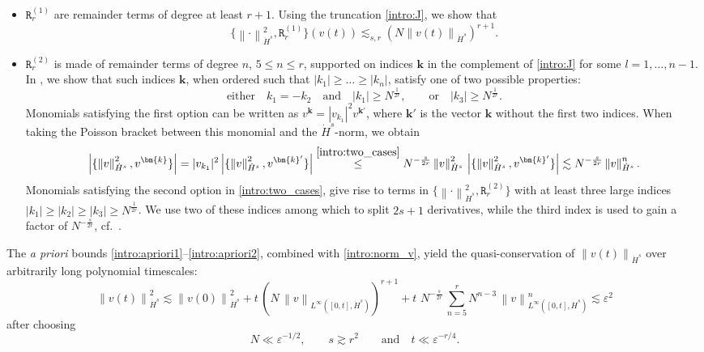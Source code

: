 \documentclass[a4paper,10pt,reqno]{article}
\theoremstyle{definition}
\theoremstyle{plain}
\theoremstyle{plain}
\theoremstyle{definition}
\theoremstyle{plain}
\theoremstyle{plain}
\theoremstyle{plain}
\theoremstyle{definition}
\theoremstyle{definition}
\newcommand{\norm}[1]{\left\lVert #1 \right\rVert}
\def \k{\bm{k}}
\begin{document}
\begin{itemize}
    \item $\mathtt{R}_r^{(1)}$ are remainder terms of degree at least $r+1$. Using the truncation \eqref{intro:J}, we show that 
    \begin{equation}\label{intro:apriori1}
         \{ \norm{\cdot}_{\dot{H}^s}^2, \mathtt{R}_r^{(1)} \} (v(t)) \lesssim_{s,r} ( N \norm{v(t)}_{\dot{H}^s})^{r+1}.
    \end{equation}
    \item $\mathtt{R}_r^{(2)}$ is made of remainder terms of degree $n$, $5\leq n\leq r$, supported on indices $\k$ in the complement of \eqref{intro:J} for some $l=1,\ldots,n-1$. In , we show that such indices $\k$, when ordered such that $|k_1|\geq \ldots \geq |k_n|$, satisfy one of two possible properties: 
    \begin{equation}\label{intro:two_cases}
    \mbox{either} \quad k_1=-k_2 \quad \mbox{and} \quad |k_1|\geq N^{\frac{1}{2r}},\qquad \mbox{or}\quad |k_3|\geq N^{\frac{1}{2r}}. 
    \end{equation}
    Monomials satisfying the first option can be written as $v^{\k} = |v_{k_1}|^2 v^{\k'}$, where $\k'$ is the vector $\k$ without the first two indices. When taking the Poisson bracket between this monomial and the $\dot{H}^s$-norm, we obtain 
    \begin{equation}\label{intro:apriori2}
        \left \lvert \{\norm{v}_{\dot{H}^s}^2, v^{\k}\} \right \rvert =
        |v_{k_1}|^2 \left \lvert \{ \norm{v}_{\dot{H}^s}^2 , v^{\k'} \} \right \rvert \stackrel{\eqref{intro:two_cases}}{\le} N^{-\frac{s}{2r}} \norm{v}_{\dot{H}^s}^2\, \left \lvert \{ \norm{v}_{\dot{H}^s}^2 , v^{\k'} \} \right \rvert  \lesssim N^{-\frac{s}{2r}} \norm{v}_{\dot{H}^s}^{n}.
    \end{equation}
Monomials satisfying the second option in \eqref{intro:two_cases}, give rise to terms in  $ \{ \norm{\cdot}_{\dot{H}^s}^2, \mathtt{R}_r^{(2)} \}$ with at least three large indices $|k_1|\geq |k_2|\geq |k_3|\geq N^{\frac{1}{2r}}$. We use two of these indices among which to split $2s+1$ derivatives, while the third index is used to gain a factor of $N^{-\frac{s}{2r}}$, cf.~.
\end{itemize}


The \emph{a priori} bounds \eqref{intro:apriori1}--\eqref{intro:apriori2}, combined with \eqref{intro:norm_v}, yield the quasi-conservation of $\norm{v(t)}_{\dot{H}^s}$ over arbitrarily long polynomial timescales: 
\begin{equation} \label{intro:bound1}
   \norm{v(t)}_{\dot{H}^s}^2 \lesssim \norm{v(0)}_{\dot{H}^s}^2  + t \, (N\,\norm{v}_{L^{\infty}([0,t],\dot{H}^s)})^{r+1} + t\, \,N^{-\frac{s}{2r}}\, \sum_{n=5}^r N^{n-3} \, \norm{v}_{L^{\infty}([0,t],\dot{H}^s)}^{n} \lesssim \varepsilon^2 
\end{equation}
after choosing
\begin{equation} \label{intro: parameters}
N\ll \varepsilon^{-1/2}, \qquad s \gtrsim r^2 \qquad  \mbox{and} \quad t\ll \varepsilon^{-r/4}.
\end{equation}
\end{document}
